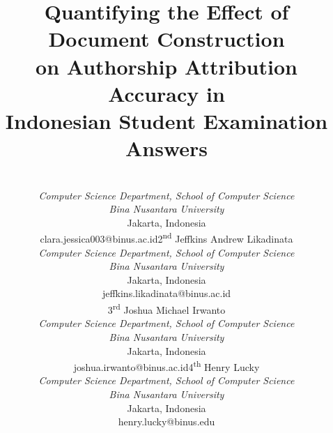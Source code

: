\documentclass[conference]{IEEEtran}
\begin{document}
\title{Quantifying the Effect of Document Construction\\on Authorship Attribution Accuracy in\\Indonesian Student Examination Answers}

\author{%
\footnotesize
\begin{tabular}{@{}>{\centering}p{}@{}
                   >{\centering}p{}@{}}
{\normalsize 1\textsuperscript{st} Clara Jessica}\\
\textit{Computer Science Department, School of Computer Science}\\
\textit{Bina Nusantara University}\\
Jakarta, Indonesia\\
clara.jessica003@binus.ac.id &
{\normalsize 2\textsuperscript{nd} Jeffkins Andrew Likadinata}\\
\textit{Computer Science Department, School of Computer Science}\\
\textit{Bina Nusantara University}\\
Jakarta, Indonesia\\
jeffkins.likadinata@binus.ac.id \tabularnewline
\rule{0pt}{4.5ex}{\normalsize 3\textsuperscript{rd} Joshua Michael Irwanto}\\
\textit{Computer Science Department, School of Computer Science}\\
\textit{Bina Nusantara University}\\
Jakarta, Indonesia\\
joshua.irwanto@binus.ac.id &
{\normalsize 4\textsuperscript{th} Henry Lucky}\\
\textit{Computer Science Department, School of Computer Science}\\
\textit{Bina Nusantara University}\\
Jakarta, Indonesia\\
henry.lucky@binus.edu
\end{tabular}}

\maketitle
\end{document}
